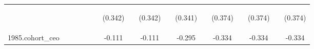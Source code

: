 \begin{center}
\begin{tabular}{lcccccccccccccccc}
\vspace{4pt} & \begin{footnotesize}\end{footnotesize} & \begin{footnotesize}\end{footnotesize} & \begin{footnotesize}\end{footnotesize} & \begin{footnotesize}\end{footnotesize} & \begin{footnotesize}\end{footnotesize} & \begin{footnotesize}(0.342)\end{footnotesize} & \begin{footnotesize}\end{footnotesize} & \begin{footnotesize}(0.342)\end{footnotesize} & \begin{footnotesize}\end{footnotesize} & \begin{footnotesize}(0.341)\end{footnotesize} & \begin{footnotesize}\end{footnotesize} & \begin{footnotesize}(0.374)\end{footnotesize} & \begin{footnotesize}\end{footnotesize} & \begin{footnotesize}(0.374)\end{footnotesize} & \begin{footnotesize}\end{footnotesize} & \begin{footnotesize}(0.374)\end{footnotesize} \\
1985.cohort\_ceo &  &  &  &  &  & -0.111 &  & -0.111 &  & -0.295 &  & -0.334 &  & -0.334 &  & -0.334 \\

\end{tabular}
\end{center}

